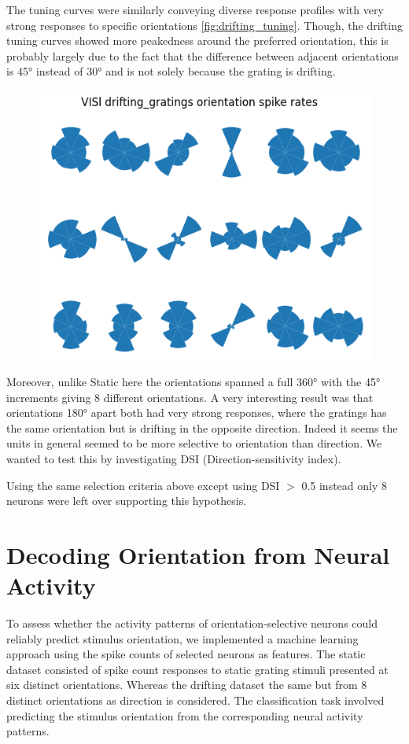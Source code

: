 \documentclass[10pt,twocolumn]{article}
\begin{document}
The tuning curves were similarly conveying diverse response profiles with very strong responses to specific orientations \ref{fig:drifting_tuning}. Though, the drifting tuning curves showed more peakedness around the preferred orientation, this is probably largely due to the fact that the difference between adjacent orientations is 45° instead of 30° and is not solely because the grating is drifting.

\begin{figure}[h]
  \centering
  \includegraphics[width=0.6\linewidth]{report_images/drifting_unit_mean_orientation.png}
\end{figure}

Moreover, unlike Static here the orientations spanned a full 360° with the 45° increments giving 8 different orientations. A very interesting result was that orientations 180° apart both had very strong responses, where the gratings has the same orientation but is drifting in the opposite direction. Indeed it seems the units in general seemed to be more selective to orientation than direction. We wanted to test this by investigating DSI (Direction-sensitivity index).

Using the same selection criteria above except using DSI $>$ 0.5 instead only 8 neurons were left over supporting this hypothesis.

\section{Decoding Orientation from Neural Activity}

To assess whether the activity patterns of orientation-selective neurons could reliably predict stimulus orientation, we implemented a machine learning approach using the spike counts of selected neurons as features. The static dataset consisted of spike count responses to static grating stimuli presented at six distinct orientations. Whereas the drifting dataset the same but from 8 distinct orientations as direction is considered. The classification task involved predicting the stimulus orientation from the corresponding neural activity patterns.
\end{document}
